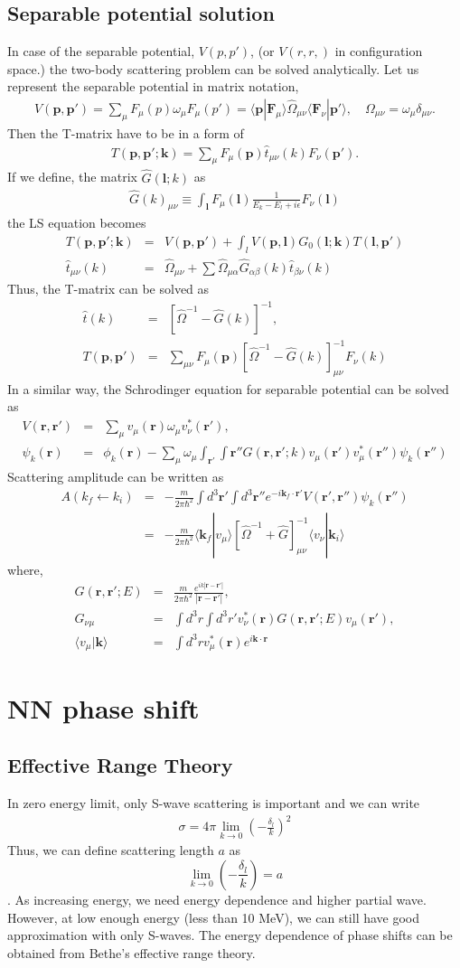 \documentclass[10pt]{article}
\def\bm{\boldsymbol}
\newcommand{\bea}{\begin{eqnarray}}
\newcommand{\eea}{\end{eqnarray}}
\newcommand{\no}{\nonumber \\}
\def\vp{{\bm p}}
\def\vk{{\bm k}}
\def\vl{{\bm l}}
\def\vr{{\bm r}}
\def\la{\langle}
\def\ra{\rangle}
\begin{document}
\subsection{Separable potential solution}
In case of the separable potential, $V(p,p')$,
(or $V(r,r,)$ in configuration space.) 
the two-body scattering problem can be solved analytically.
Let us represent the separable potential in matrix notation,
\bea
V(\vp,\vp')=\sum_\mu F_\mu(p)\omega_\mu F_\mu(p')
       =\la \vp|{\bm F}_\mu\ra \hat{\Omega}_{\mu\nu}\la {\bm F}_\nu|\vp'\ra,
       \quad \Omega_{\mu\nu}=\omega_\mu\delta_{\mu\nu} .
\eea 
Then the T-matrix 
have to be in a form of
\bea
T(\vp,\vp';\vk)=\sum_\mu F_\mu(\vp) \hat{t}_{\mu\nu}(k) F_\nu(\vp').
\eea
If we define, the matrix $\hat{G}(\vl; k)$ as
\bea
\hat{G}(k)_{\mu\nu}\equiv
\int_{\vl} F_\mu(\vl)\frac{1}{E_k-E_l+i\epsilon} F_\nu(\vl)
\eea
the LS equation becomes
\bea
T(\vp,\vp';\vk)&=&
V(\vp,\vp')+\int_{l} V(\vp,\vl)G_0(\vl;\vk)T(\vl,\vp')\no
\hat{t}_{\mu\nu}(k)
&=& \hat{\Omega}_{\mu\nu}
+\sum \hat{\Omega}_{\mu\alpha}
 \hat{G}_{\alpha\beta}(k)
 \hat{t}_{\beta\nu}(k)
\eea
Thus, the T-matrix can be solved as
\bea
\hat{t}(k)&=&[\hat{\Omega}^{-1}-\hat{G}(k)]^{-1},\no 
T(\vp,\vp')&=&\sum_{\mu\nu} F_\mu(\vp)\left[\hat{\Omega}^{-1}-\hat{G}(k)\right]^{-1}_{\mu\nu}
F_{\nu}(k)
\eea
In a similar way, the Schrodinger equation for separable potential
can be solved as
\bea
V(\vr,\vr')&=&\sum_\mu v_\mu(\vr) \omega_\mu v^*_\nu(\vr'),\no
\psi_k(\vr)&=&\phi_k(\vr)
           -\sum_\mu \omega_\mu 
           \int_{\vr'}\int{\vr''} G(\vr,\vr';k) v_\mu(\vr')
            v_\mu^*(\vr'')\psi_k(\vr'')
\eea
Scattering amplitude can be written as
\bea
A(k_f\leftarrow k_i)
&=&-\frac{m}{2\pi\hbar^2}\int d^3\vr'\int d^3\vr''
  e^{-i\vk_f\cdot\vr'} V(\vr',\vr'')\psi_k(\vr'') \no
&=&-\frac{m}{2\pi\hbar^2}
   \la \vk_f|v_\mu\ra \left[\hat{\Omega}^{-1}+\hat{G} \right]^{-1}_{\mu\nu}\la v_\nu|\vk_i\ra
\eea
where,
\bea
G(\vr,\vr';E)&=&\frac{m}{2\pi\hbar^2}
                \frac{e^{ik|\vr-\vr'|}}{|\vr-\vr'|},\no
G_{\nu\mu}&=&\int d^3 r\int d^3 r'
            v_\nu^*(\vr) G(\vr,\vr';E) v_\mu(\vr') ,\no
\la v_\mu|\vk\ra&=&\int d^3 r 
v_\mu^*(\vr)e^{i\vk\cdot\vr}                             
\eea


\section{NN phase shift}
\subsection{Effective Range Theory}
In zero energy limit, only S-wave scattering is important and we can write
\bea 
\sigma=4\pi \lim_{k\to 0}(-\frac{\delta_l}{k} )^2
\eea 
Thus, we can define scattering length $a$ as 
$$\lim_{k\to 0}(-\frac{\delta_l}{k} )=a$$. 
As increasing energy, we need energy dependence and higher partial wave. 
However, at low enough energy (less than 10 MeV), we can still have
good approximation with only S-waves. The energy dependence of phase 
shifts can be obtained from Bethe's effective range theory.
\end{document}
